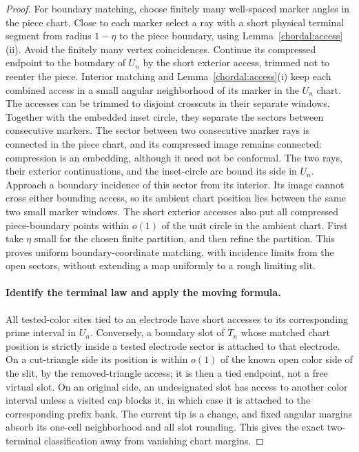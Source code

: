 \begin{proof}
For boundary matching, choose finitely many well-spaced marker
angles in the piece chart.  Close to each marker select a ray with
a short physical terminal segment from radius $1-\eta$ to the
piece boundary, using Lemma~\ref{chordal:access}(ii).  Avoid the
finitely many vertex coincidences.  Continue its compressed endpoint
to the boundary of $U_n$ by the short exterior access, trimmed not
to reenter the piece.  Interior matching and
Lemma~\ref{chordal:access}(i) keep each combined access in a small
angular neighborhood of its marker in the $U_n$ chart.  The accesses
can be trimmed to disjoint crosscuts in their separate windows.
Together with the embedded inset circle, they separate the sectors
between consecutive markers.  The sector between two consecutive
marker rays is connected in the piece chart, and its compressed image
remains connected: compression is an embedding, although it need not
be conformal.  The two rays, their exterior continuations, and the
inset-circle arc bound its side in $U_n$.  Approach a boundary
incidence of this sector from its interior.  Its image cannot cross
either bounding access, so its ambient chart position lies between
the same two small marker windows.  The short exterior accesses also
put all compressed piece-boundary points within $o(1)$ of the unit
circle in the ambient chart.  First take $\eta$ small for the chosen finite
partition, and then refine the partition.  This proves uniform
boundary-coordinate matching, with incidence limits from the open
sectors, without extending a map uniformly to a rough limiting slit.

\paragraph{Identify the terminal law and apply the moving formula.}
All tested-color sites tied to an electrode have short accesses to
its corresponding prime interval in $U_n$.  Conversely, a boundary
slot of $T_n$ whose matched chart position is strictly inside a
tested electrode sector is attached to that electrode.  On a
cut-triangle side its position is within $o(1)$ of the known open
color side of the slit, by the removed-triangle access; it is then
a tied endpoint, not a free virtual slot.  On an original side,
an undesignated slot has access to another color interval unless
a visited cap blocks it, in which case it is attached to the
corresponding prefix bank.  The current tip is a change, and fixed
angular margins absorb its one-cell neighborhood and all slot
rounding.  This gives the exact two-terminal classification away
from vanishing chart margins.


\end{proof}
